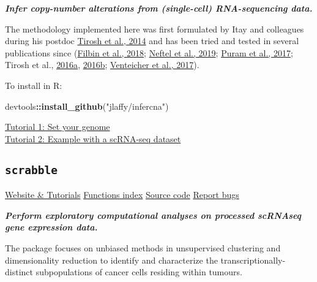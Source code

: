 \documentclass[]{book}
\newenvironment{Shaded}{\begin{snugshade}}{\end{snugshade}}
\newcommand{\KeywordTok}[1]{\textcolor[rgb]{0.13,0.29,0.53}{\textbf{#1}}}
\newcommand{\StringTok}[1]{\textcolor[rgb]{0.31,0.60,0.02}{#1}}
\newcommand{\OperatorTok}[1]{\textcolor[rgb]{0.81,0.36,0.00}{\textbf{#1}}}
\newcommand{\NormalTok}[1]{#1}
\begin{document}
\emph{\textbf{Infer copy-number alterations from (single-cell)
RNA-sequencing data.}}

The methodology implemented here was first formulated by Itay and
colleagues during his postdoc
\href{https://science.sciencemag.org/content/344/6190/1396.long}{Tirosh
et al., 2014} and has been tried and tested in several publications
since
(\href{https://science.sciencemag.org/content/360/6386/331.long}{Filbin
et al., 2018};
\href{https://www.ncbi.nlm.nih.gov/pubmed/31327527}{Neftel et al.,
2019}; \href{https://www.ncbi.nlm.nih.gov/pubmed/29198524}{Puram et al.,
2017}; Tirosh et al.,
\href{https://science.sciencemag.org/content/352/6282/189.long}{2016a},
\href{https://www.nature.com/articles/nature20123}{2016b};
\href{https://science.sciencemag.org/content/355/6332/eaai8478.long}{Venteicher
et al., 2017}).

To install in R:

\begin{Shaded}
\begin{Highlighting}[]
\NormalTok{devtools}\OperatorTok{::}\KeywordTok{install_github}\NormalTok{(}\StringTok{"jlaffy/infercna"}\NormalTok{)}
\end{Highlighting}
\end{Shaded}

\href{https://jlaffy.github.io/infercna/articles/useGenome.html}{Tutorial
1: Set your genome}\\
\href{https://jlaffy.github.io/infercna/articles/infercna_tutorial.html}{Tutorial
2: Example with a scRNA-seq dataset}

\subsection{\texorpdfstring{\texttt{scrabble}}{scrabble}}\label{scrabble}

\href{https://jlaffy.github.io/scrabble}{Website \& Tutorials}
\textbar{}
\href{https://jlaffy.github.io/scrabble/reference/index.html}{Functions
index} \textbar{} \href{https://github.com/jlaffy/scrabble}{Source code}
\textbar{} \href{https://github.com/jlaffy/scrabble/issues}{Report bugs}

\emph{\textbf{Perform exploratory computational analyses on processed
scRNAseq gene expression data.}}

The package focuses on unbiased methods in unsupervised clustering and
dimensionality reduction to identify and characterize the
transcriptionally-distinct subpopulations of cancer cells residing
within tumours.
\end{document}
